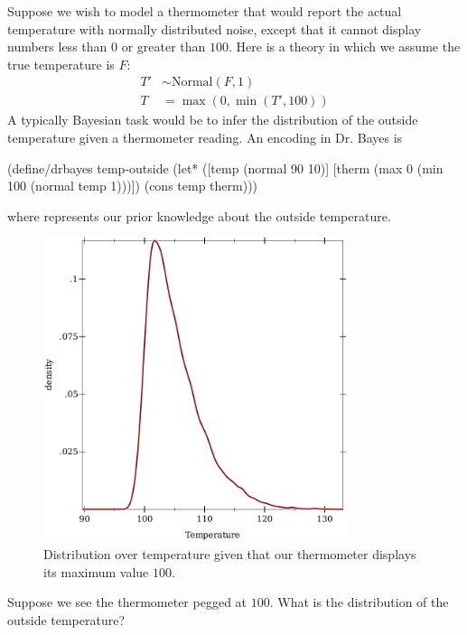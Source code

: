 Suppose we wish to model a thermometer that would report the actual temperature with normally distributed noise, except that it cannot display numbers less than $0$ or greater than $100$.
Here is a theory in which we assume the true temperature is $\mathit{F}$:
%
\begin{equation}
\begin{aligned}
	T' &\sim \mathrm{Normal}(F,1) \\
	T &= \max(0,\min(T',100))
\end{aligned}
\end{equation}
%
A typically Bayesian task would be to infer the distribution of the outside temperature given a thermometer reading.
An encoding in Dr. Bayes is
\begin{center}\singlespacing
\begin{schemedisplay}
(define/drbayes temp-outside
  (let* ([temp   (normal 90 10)]
         [therm  (max 0 (min 100 (normal temp 1)))])
    (cons temp therm)))
\end{schemedisplay}
\end{center}
where  represents our prior knowledge about the outside temperature.

\begin{figure}[tb!]\centering%
\includegraphics[width=3.5in]{results/thermometer-density}%
\caption[Bayesian inference with a bounded measuring device]{Distribution over temperature given that our thermometer displays its maximum value $100$.}%
\label{fig:thermometer-results}
\end{figure}

Suppose we see the thermometer pegged at $100$.
What is the distribution of the outside temperature?

